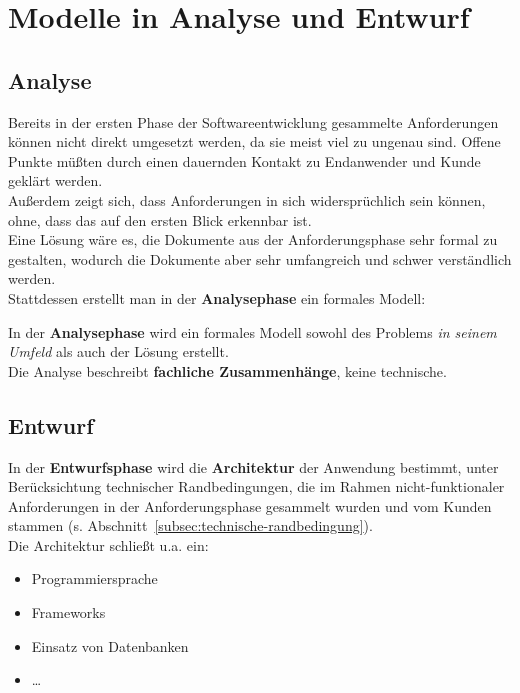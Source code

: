 \section{Modelle in Analyse und Entwurf}\label{sec:modelle-in-analyse-und-entwurf}

\subsection*{Analyse}



\noindent
Bereits in der ersten Phase der Softwareentwicklung gesammelte Anforderungen können nicht direkt umgesetzt werden, da sie meist viel zu ungenau sind.
Offene Punkte müßten durch einen dauernden Kontakt zu Endanwender und Kunde geklärt werden.\\
Außerdem zeigt sich, dass Anforderungen in sich widersprüchlich sein können, ohne, dass das auf den ersten Blick erkennbar ist.\\

\noindent
Eine Lösung wäre es, die Dokumente aus der Anforderungsphase sehr formal zu gestalten, wodurch die Dokumente aber sehr umfangreich und schwer verständlich werden.\\

\noindent
Stattdessen erstellt man in der \textbf{Analysephase} ein formales Modell:

\vspace{2mm}
\begin{tcolorbox}
    In der \textbf{Analysephase} wird ein formales Modell sowohl des Problems \textit{in seinem Umfeld} als auch der Lösung erstellt.\\
    Die Analyse beschreibt \textbf{fachliche Zusammenhänge}, keine technische.
\end{tcolorbox}
\vspace{2mm}


\subsection*{Entwurf}
In der \textbf{Entwurfsphase} wird die \textbf{Architektur} der Anwendung bestimmt, unter Berücksichtung technischer Randbedingungen, die im Rahmen nicht-funktionaler Anforderungen in der Anforderungsphase gesammelt wurden und vom Kunden stammen (s. Abschnitt~\ref{subsec:technische-randbedingung}).\\
Die Architektur schließt u.a. ein:

\begin{itemize}
    \item Programmiersprache
    \item Frameworks
    \item Einsatz von Datenbanken
    \item \ldots
\end{itemize}

